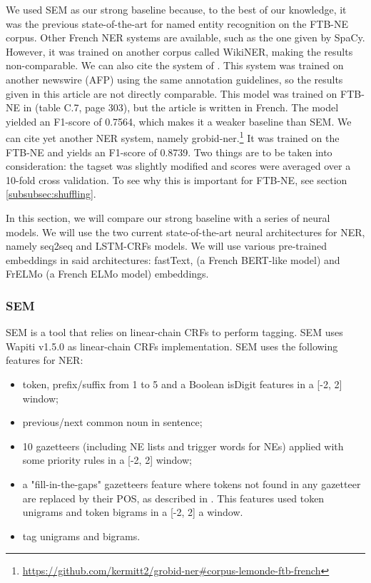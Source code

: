 We used SEM \cite{dupont-2017-exploration} as our strong baseline because, to the best of our knowledge, it was the previous state-of-the-art for named entity recognition on the FTB-NE corpus.
Other French NER systems are available, such as the one given by SpaCy. However, it was trained on another corpus called WikiNER, making the results non-comparable.
We can also cite the system of \cite{stern-etal-2012-joint}. This system was trained on another newswire (AFP) using the same annotation guidelines, so the results given in this article are not directly comparable. This model was trained on FTB-NE in  (table C.7, page 303), but the article is written in French. The model yielded an F1-score of 0.7564, which makes it a weaker baseline than SEM.
We can cite yet another NER system, namely grobid-ner.\footnote{\url{https://github.com/kermitt2/grobid-ner\#corpus-lemonde-ftb-french}} It was trained on the FTB-NE and yields an F1-score of 0.8739. Two things are to be taken into consideration: the tagset was slightly modified and scores were averaged over a 10-fold cross validation. To see why this is important for FTB-NE, see section \ref{subsubsec:shuffling}.

In this section, we will compare our strong baseline with a series of neural models. We will use the two current state-of-the-art neural architectures for NER, namely seq2seq and LSTM-CRFs models. We will use various pre-trained embeddings in said architectures: fastText, \camembert (a French BERT-like model) and FrELMo (a French ELMo model) embeddings.


\subsubsection{SEM}
SEM \cite{dupont-2017-exploration} is a tool that relies on linear-chain CRFs \cite{lafferty-etal-2001-conditional} to perform tagging. SEM uses Wapiti \cite{lavergne-etal-2010-practical} v1.5.0 as linear-chain CRFs implementation. SEM uses the following features for NER:
\begin{itemize}
    \item token, prefix/suffix from 1 to 5 and a Boolean isDigit features in a [-2, 2] window;
    \item previous/next common noun in sentence;
    \item 10 gazetteers (including NE lists and trigger words for NEs) applied with some priority rules in a [-2, 2] window;
    \item a "fill-in-the-gaps" gazetteers feature where tokens not found in any gazetteer are replaced by their POS, as described in \cite{raymond-fayolle-2010-reconnaissance}. This features used token unigrams and token bigrams in a [-2, 2] a window.
    \item tag unigrams and bigrams.
\end{itemize}


